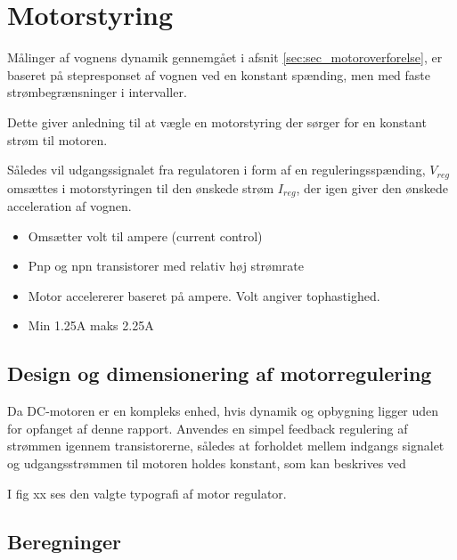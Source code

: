 \section{Motorstyring }\label{sec:sec_motorstyring}
Målinger af vognens dynamik gennemgået i afsnit \ref{sec:sec_motoroverforelse}, er baseret på stepresponset af vognen ved en konstant spænding, men med faste strømbegrænsninger i intervaller.

Dette giver anledning til at vægle en motorstyring der sørger for en konstant strøm til motoren.
 
Således vil udgangssignalet fra regulatoren i form af en reguleringsspænding, $V_{reg}$ omsættes i motorstyringen til den ønskede strøm $I_{reg}$, der igen giver den ønskede acceleration af vognen.  


\begin{itemize}
	\item Omsætter volt til ampere (current control)
	\item Pnp og npn transistorer med relativ høj strømrate
	\item Motor accelererer baseret på ampere. Volt angiver tophastighed.
	\item Min 1.25A maks 2.25A
\end{itemize}

\subsection{Design og dimensionering af motorregulering}
Da DC-motoren er en kompleks enhed, hvis dynamik og opbygning ligger uden for opfanget af denne rapport. 
Anvendes en simpel feedback regulering af strømmen igennem transistorerne, således at forholdet mellem indgangs signalet og udgangsstrømmen til motoren holdes konstant, som kan beskrives ved

I fig xx ses den valgte typografi af motor regulator.


\subsection{Beregninger}

